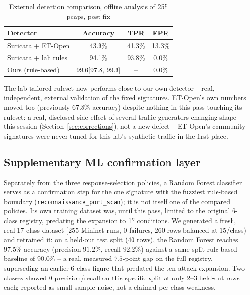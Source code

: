 \documentclass[conference]{IEEEtran}
\newcommand{\ci}[2]{[#1, #2]}
\begin{document}
\begin{table}[t]
\centering
\caption{External detection comparison, offline analysis of 255 pcaps, post-fix}
\label{tab:suricata}
\scriptsize
\setlength{\tabcolsep}{3pt}
\begin{tabular}{@{}lccc@{}}
\toprule
\textbf{Detector} & \textbf{Accuracy} & \textbf{TPR} & \textbf{FPR} \\
\midrule
Suricata + ET-Open & 43.9\% & 41.3\% & 13.3\% \\
Suricata + lab rules & 94.1\% & 93.8\% & 0.0\% \\
Ours (rule-based) & 99.6\ci{97.8}{99.9} & -- & 0.0\% \\
\bottomrule
\end{tabular}
\end{table}

The lab-tailored ruleset now performs close to our own detector -- real, independent, external
validation of the fixed signatures. ET-Open's own numbers moved too (previously $67.8\%$
accuracy) despite nothing in this pass touching its ruleset: a real, disclosed side effect of
several traffic generators changing shape this session (Section~\ref{sec:corrections}), not a new
defect -- ET-Open's community signatures were never tuned for this lab's synthetic traffic in the
first place.

\subsection{Supplementary ML confirmation layer}

Separately from the three response-selection policies, a Random Forest classifier serves as a
confirmation step for the one signature with the fuzziest rule-based boundary
(\texttt{reconnaissance\_port\_scan}); it is not itself one of the compared policies. Its own
training dataset was, until this pass, limited to the original 6-class registry, predating the
expansion to 17 conditions. We generated a fresh, real 17-class dataset ($255$ Mininet runs, $0$
failures, $260$ rows balanced at $15$/class) and retrained it: on a held-out test split ($40$
rows), the Random Forest reaches $97.5\%$ accuracy (precision $91.2\%$, recall $92.2\%$) against a
same-split rule-based baseline of $90.0\%$ -- a real, measured $7.5$-point gap on the full registry,
superseding an earlier $6$-class figure that predated the ten-attack expansion. Two classes showed
$0$ precision/recall on this specific split at only $2$--$3$ held-out rows each; reported as
small-sample noise, not a claimed per-class weakness.
\end{document}
